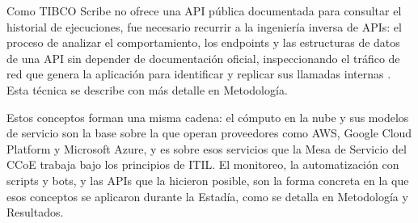 Como TIBCO Scribe no ofrece una API pública documentada para consultar el historial de ejecuciones, fue necesario recurrir a la ingeniería inversa de APIs: el proceso de analizar el comportamiento, los endpoints y las estructuras de datos de una API sin depender de documentación oficial, inspeccionando el tráfico de red que genera la aplicación para identificar y replicar sus llamadas internas \cite{apidog_ingenieria_inversa_apis}. Esta técnica se describe con más detalle en Metodología.

Estos conceptos forman una misma cadena: el cómputo en la nube y sus modelos de servicio son la base sobre la que operan proveedores como AWS, Google Cloud Platform y Microsoft Azure, y es sobre esos servicios que la Mesa de Servicio del CCoE trabaja bajo los principios de ITIL. El monitoreo, la automatización con scripts y bots, y las APIs que la hicieron posible, son la forma concreta en la que esos conceptos se aplicaron durante la Estadía, como se detalla en Metodología y Resultados.
